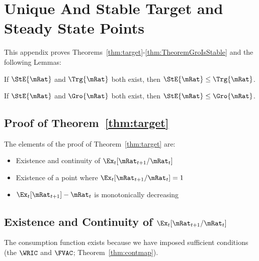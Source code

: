 \documentclass[\econtexRoot/BufferStockTheory]{subfiles}
\begin{document}

\hypertarget{ApndxMTargetIsStable}{}
\section{Unique And Stable Target and Steady State Points}\label{sec:ApndxMTargetIsStable}


This appendix proves Theorems~\ref{thm:target}-\ref{thm:TheoremGroIsStable} and the following Lemmas:
\onlyinsubfile{\setcounter{theorem}{1}}

  \begin{lemma}\label{lemma:orderingPartOne}
  If $\StE{\mRat}$ and $\Trg{\mRat}$ both exist, then $\StE{\mRat} \leq \Trg{\mRat}$.
  \end{lemma}

  \begin{lemma}\label{lemma:orderingPartTwo}
  If $\StE{\mRat}$ and $\Gro{\mRat}$ both exist, then $\StE{\mRat} \leq \Gro{\mRat}$.
  \end{lemma}

  \subsection{Proof of Theorem~\ref{thm:target}}
  
  The elements of the proof of Theorem~\ref{thm:target} are:
\begin{itemize}
\item Existence and continuity of $\Ex_t [{\mRat}_{t+1}/\mRat_t]$
\item Existence of a point where $\Ex_t [{\mRat}_{t+1}/\mRat_t] = 1$
\item $\Ex_t [{\mRat}_{t+1}]-\mRat_{t}$ is monotonically decreasing
\end{itemize}


\subsection{Existence and Continuity of
  \texorpdfstring{$\Ex_t [{\mRat}_{t+1}/\mRat_t]$}{Ex-{t}[mRat-{t+1}/mRat-{t}]}}\label{subsubsec:RatExitsCont}
The consumption function exists because we have imposed sufficient conditions (the $\WRIC$ and $\FVAC$; Theorem~\ref{thm:contmap}). %
\end{document}
